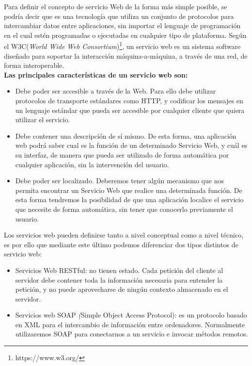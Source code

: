 Para definir el concepto de servicio Web de la forma más simple posible, se podría decir que es una tecnología que utiliza un conjunto de protocolos para intercambiar datos entre aplicaciones, sin importar el lenguaje de programación en el cual estén programadas o ejecutadas en cualquier tipo de plataforma. Según el W3C(\textit{World Wide Web Consortium})\footnote{https://www.w3.org/}, un servicio web es un sistema software diseñado para soportar la interacción máquina-a-máquina, a través de una red, de forma interoperable. \\



\textbf{Las principales características de un servicio web son:}


\begin{itemize}
\item Debe poder ser accesible a través de la Web. Para ello debe utilizar protocolos de transporte estándares como HTTP, y codificar los mensajes en un lenguaje estándar que pueda ser accesible por cualquier cliente que quiera utilizar el servicio. 

\item Debe contener una descripción de sí mismo. De esta forma, una aplicación web podrá saber cual es la función de un determinado Servicio Web, y cuál es su interfaz, de manera que pueda ser utilizado de forma automática por cualquier aplicación, sin la intervención del usuario.
\item Debe poder ser localizado. Deberemos tener algún mecanismo que nos permita encontrar un Servicio Web que realice una determinada función. De esta forma tendremos la posibilidad de que una aplicación localice el servicio que necesite de forma automática, sin tener que conocerlo previamente el usuario.
\end{itemize}


Los servicios web pueden definirse tanto a nivel conceptual como a nivel técnico, es por ello que mediante este último podemos diferenciar dos tipos distintos de servicio web:
\begin{itemize}
	\item Servicios Web RESTful: no tienen estado. Cada petición del cliente al servidor debe contener toda la información necesaria para entender la petición, y no puede aprovecharse de ningún contexto almacenado en el servidor.
	\item Servicios web SOAP  \textit({Simple Object Access Protocol}): es un protocolo basado en XML para el intercambio de información entre ordenadores. Normalmente utilizaremos SOAP para conectarnos a un servicio e invocar métodos remotos.
\end{itemize}

